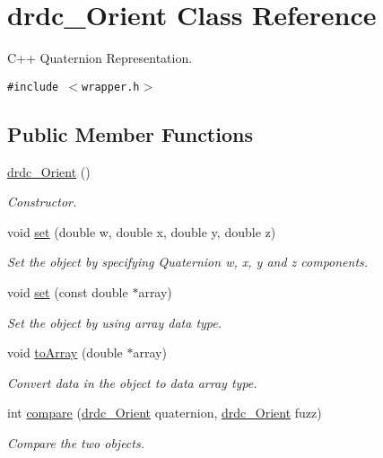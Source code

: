 \hypertarget{classdrdc__Orient}{
\section{drdc\_\-Orient Class Reference}
\label{classdrdc__Orient}
}
C++ Quaternion Representation.  


{\tt \#include $<$wrapper.h$>$}

\subsection*{Public Member Functions}
\begin{CompactItemize}
\item 
\hyperlink{classdrdc__Orient_f89888fb11efcf890f1e99d413c242f8}{drdc\_\-Orient} ()
\begin{CompactList}\small\item\em Constructor. \item\end{CompactList}\item 
void \hyperlink{classdrdc__Orient_642bb1378fd6c41a0aebfee8e810d0b6}{set} (double w, double x, double y, double z)
\begin{CompactList}\small\item\em Set the object by specifying Quaternion w, x, y and z components. \item\end{CompactList}\item 
void \hyperlink{classdrdc__Orient_0c6237458b433366d8b4dbebd3aae07f}{set} (const double $\ast$array)
\begin{CompactList}\small\item\em Set the object by using array data type. \item\end{CompactList}\item 
void \hyperlink{classdrdc__Orient_e1370cfb23679b196d42b365f1320031}{toArray} (double $\ast$array)
\begin{CompactList}\small\item\em Convert data in the object to data array type. \item\end{CompactList}\item 
int \hyperlink{classdrdc__Orient_983ee9cf2e5b2c531e81505317021751}{compare} (\hyperlink{classdrdc__Orient}{drdc\_\-Orient} quaternion, \hyperlink{classdrdc__Orient}{drdc\_\-Orient} fuzz)
\begin{CompactList}\small\item\em Compare the two objects. \item\end{CompactList}\item 

\end{CompactItemize}
